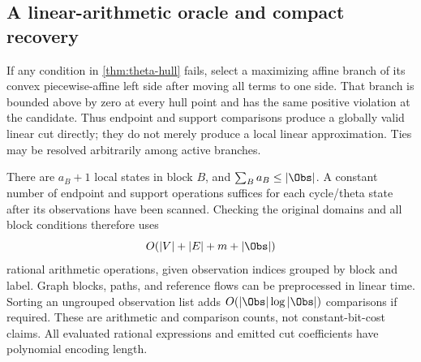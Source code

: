 \subsection{A linear-arithmetic oracle and compact recovery}\label{subsec:theta-oracle}
If any condition in \cref{thm:theta-hull} fails, select a maximizing
affine branch of its convex piecewise-affine left side after moving all
terms to one side. That branch is bounded above by zero at every hull
point and has the same positive violation at the candidate. Thus endpoint
and support comparisons produce a globally valid linear cut directly;
they do not merely produce a local linear approximation. Ties may be
resolved arbitrarily among active branches.

There are $a_B+1$ local states in block $B$, and
$\sum_Ba_B\le|\Obs|$. A constant number of endpoint and support
operations suffices for each cycle/theta state after its observations
have been scanned. Checking the original domains and all block conditions
therefore uses
\begin{equation}\label{eq:theta-oracle-complexity}
 O(|V|+|E|+m+|\Obs|)
\end{equation}
rational arithmetic operations, given observation indices grouped by
block and label. Graph blocks, paths, and reference flows can be
preprocessed in linear time. Sorting an ungrouped observation list adds
$O(|\Obs|\log|\Obs|)$ comparisons if required. These are arithmetic and
comparison counts, not constant-bit-cost claims. All evaluated rational
expressions and emitted cut coefficients have polynomial encoding length.

